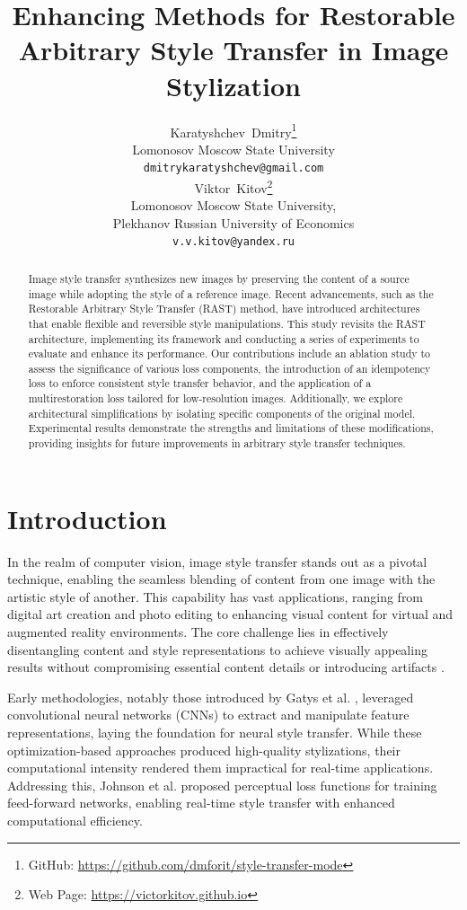 \documentclass{article}
\title{Enhancing Methods for Restorable Arbitrary Style Transfer in Image Stylization}
\author{
    Karatyshchev~Dmitry\thanks{GitHub: \url{https://github.com/dmforit/style-transfer-mode}} \\
    Lomonosov Moscow State University\\
    \texttt{dmitrykaratyshchev@gmail.com} \\
    \And
    Viktor~Kitov\thanks{Web Page: \url{https://victorkitov.github.io}} \\
    Lomonosov Moscow State University,\\
    Plekhanov Russian University of Economics\\
    \texttt{v.v.kitov@yandex.ru} \\
}
\date{}
\begin{document}
\maketitle

\begin{abstract}
Image style transfer synthesizes new images by preserving the content of a source image while adopting the style of a reference image. Recent advancements, such as the Restorable Arbitrary Style Transfer (RAST) method, have introduced architectures that enable flexible and reversible style manipulations. This study revisits the RAST architecture, implementing its framework and conducting a series of experiments to evaluate and enhance its performance. Our contributions include an ablation study to assess the significance of various loss components, the introduction of an idempotency loss to enforce consistent style transfer behavior, and the application of a multirestoration loss tailored for low-resolution images. Additionally, we explore architectural simplifications by isolating specific components of the original model. Experimental results demonstrate the strengths and limitations of these modifications, providing insights for future improvements in arbitrary style transfer techniques.
\end{abstract}


\section{Introduction}
\label{sec:introduction}

In the realm of computer vision, image style transfer stands out as a pivotal technique, enabling the seamless blending of content from one image with the artistic style of another. This capability has vast applications, ranging from digital art creation and photo editing to enhancing visual content for virtual and augmented reality environments. The core challenge lies in effectively disentangling content and style representations to achieve visually appealing results without compromising essential content details or introducing artifacts \cite{Li2017}.

Early methodologies, notably those introduced by Gatys et al. \cite{Gatys2016}, leveraged convolutional neural networks (CNNs) to extract and manipulate feature representations, laying the foundation for neural style transfer. While these optimization-based approaches produced high-quality stylizations, their computational intensity rendered them impractical for real-time applications. Addressing this, Johnson et al. \cite{Johnson2016} proposed perceptual loss functions for training feed-forward networks, enabling real-time style transfer with enhanced computational efficiency.
\end{document}
